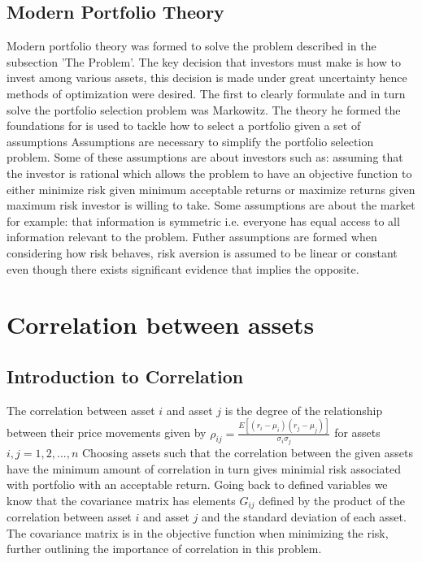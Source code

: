 \documentclass[11pt]{article}
\begin{document}
\subsection{Modern Portfolio Theory}
Modern portfolio theory was formed to solve the problem described in the subsection 'The Problem'. The key decision that investors must make is how to invest among various assets, this decision is made under great uncertainty hence methods of optimization were desired. The first to clearly formulate and in turn solve the portfolio selection problem was Markowitz. The theory he formed the foundations for is used to tackle how to select a portfolio given a set of assumptions \citep{CONSTANTINIDES19951}
\newline Assumptions are necessary to simplify the portfolio selection problem. Some of these assumptions are about investors such as: assuming that the investor is rational which allows the problem to have an objective function to either minimize risk given minimum acceptable returns or maximize returns given maximum risk investor is willing to take. Some assumptions are about the market for example: that information is symmetric i.e. everyone has equal access to all information relevant to the problem. Futher assumptions are formed when considering how risk behaves, risk aversion is assumed to be linear or constant even though there exists significant evidence that implies the opposite. \citep{doi:10.1080/20430795.2012.738600}
\section{Correlation between assets}
\subsection{Introduction to Correlation}
The correlation between asset $i$ and asset $j$ is the degree of the relationship between their price movements given by
\newline $\rho_{ij}=\frac{E[(r_{i}-\mu_{i})(r_{j}-\mu_{j})]}{\sigma_{i}\sigma_{j}}$  for assets $i,j=1,2,...,n$
\newline Choosing assets such that the correlation between the given assets have the minimum amount of correlation in turn gives minimial risk associated with portfolio with an acceptable return. Going back to defined variables we know that the covariance matrix has elements $G_{ij}$ defined by the product of the correlation between asset $i$ and asset $j$ and the standard deviation of each asset. The covariance matrix is in the objective function when minimizing the risk, further outlining the importance of correlation in this problem.
\end{document}
